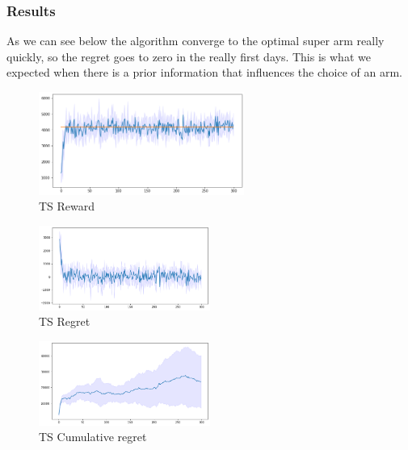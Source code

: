 \subsubsection{Results}
As we can see below the algorithm converge to the optimal super arm really quickly, so the regret goes to zero in the really first days. This is what we expected when there is a prior information that influences the choice of an arm.
\begin{figure}[ht]
    \begin{center}
    \includegraphics[width=0.6\textwidth]{img/TS3.png}
    \caption{TS Reward}
    \label{fig:reward32}
    \end{center}
\end{figure}
\begin{multicols}{2}
    \begin{figure}[H]
        \begin{center}
        \includegraphics[width=0.5\textwidth]{img/TS3_regret.png}
        \caption{TS Regret}
        \label{fig:regret32}
        \end{center}
    \end{figure}
    \columnbreak
    \begin{figure}[H]
        \begin{center}
        \includegraphics[width=0.5\textwidth]{img/TS3_cum_reg.png}
        \caption{TS Cumulative regret}
        \label{fig:cum_reg32}
        \end{center}
    \end{figure}
\end{multicols}
